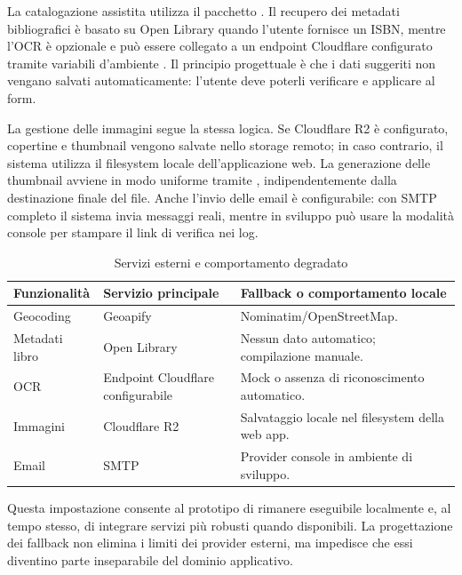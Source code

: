 La catalogazione assistita utilizza il pacchetto . Il recupero dei metadati bibliografici è basato su Open Library quando l'utente fornisce un ISBN, mentre l'OCR è opzionale e può essere collegato a un endpoint Cloudflare configurato tramite variabili d'ambiente \cite{openlibrary,cloudflareworkers}. Il principio progettuale è che i dati suggeriti non vengano salvati automaticamente: l'utente deve poterli verificare e applicare al form.

La gestione delle immagini segue la stessa logica. Se Cloudflare R2 è configurato, copertine e thumbnail vengono salvate nello storage remoto; in caso contrario, il sistema utilizza il filesystem locale dell'applicazione web. La generazione delle thumbnail avviene in modo uniforme tramite , indipendentemente dalla destinazione finale del file. Anche l'invio delle email è configurabile: con SMTP completo il sistema invia messaggi reali, mentre in sviluppo può usare la modalità console per stampare il link di verifica nei log.

\begin{table}[H]
    \centering
    \caption{Servizi esterni e comportamento degradato}
    \label{tab:servizi-fallback}
    \small
    \begin{tabularx}{\textwidth}{p{}p{}X}
        \toprule
        \textbf{Funzionalità} & \textbf{Servizio principale} & \textbf{Fallback o comportamento locale} \\
        \midrule
        Geocoding & Geoapify & Nominatim/OpenStreetMap. \\
        Metadati libro & Open Library & Nessun dato automatico; compilazione manuale. \\
        OCR & Endpoint Cloudflare configurabile & Mock o assenza di riconoscimento automatico. \\
        Immagini & Cloudflare R2 & Salvataggio locale nel filesystem della web app. \\
        Email & SMTP & Provider console in ambiente di sviluppo. \\
        \bottomrule
    \end{tabularx}
\end{table}

Questa impostazione consente al prototipo di rimanere eseguibile localmente e, al tempo stesso, di integrare servizi più robusti quando disponibili. La progettazione dei fallback non elimina i limiti dei provider esterni, ma impedisce che essi diventino parte inseparabile del dominio applicativo.
